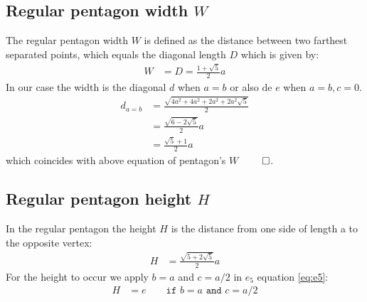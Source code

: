 \documentclass[11pt]{article}
\begin{document}
\subsection{Regular pentagon width $W$}

The regular pentagon width $W$ is defined as the 
distance between two farthest separated points, which equals the diagonal length $D$
which is given by:
\begin{align}
W &= D = \frac{1+\sqrt5}{2}a
\end{align}
In our case the width is the diagonal $d$ when $a=b$ or also de $e$ when $a=b,c=0$.
\begin{align}
d_{a=b} &= \frac{\sqrt{4a^2 + 4a^2 + 2a^2 + 2a^2\sqrt5}}2\nonumber\\
 &= \frac{\sqrt{6-2\sqrt5}}{2}a\nonumber\\
 &= \frac{\sqrt5+1}{2}a
\end{align}
which coincides with above equation of pentagon's $W$ $\qed$.

\subsection{Regular pentagon height $H$}

In the regular pentagon the height $H$ is the distance from one side of length a to the opposite vertex:
\begin{align}
H &= \frac{\sqrt{5+2\sqrt{5}}}{2}a
\end{align}
For the height to occur we apply $b = a$ and $c = a/2$ in $e_5$ equation \ref{eq:e5}:
\begin{align}
H &= e \qquad \texttt{if } b=a \texttt{ and } c=a/2 \nonumber\\
\end{align}
\end{document}
